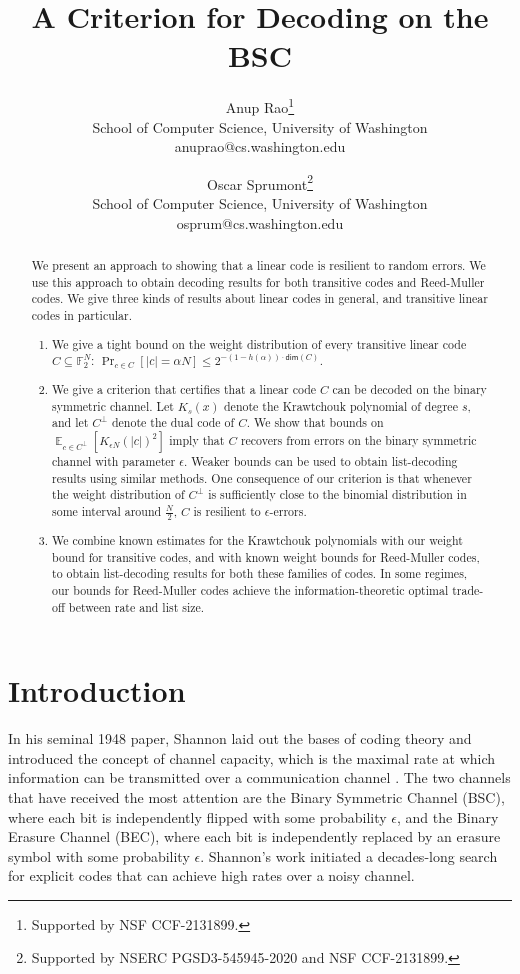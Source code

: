 \documentclass[12pt]{article}
\title{A Criterion for Decoding on the BSC}
\author{
  \fontsize{14pt}{14pt}\selectfont Anup Rao\thanks{Supported by NSF CCF-2131899.}\\
   \fontsize{12pt}{12pt}\selectfont School of Computer Science, University of Washington\\ 
    \fontsize{12pt}{12pt}\selectfont anuprao@cs.washington.edu
  \and
  \fontsize{14pt}{14pt}\selectfont Oscar Sprumont\thanks{Supported by NSERC PGSD3-545945-2020 and NSF CCF-2131899.}\\
  \fontsize{12pt}{12pt} \selectfont School of Computer Science, University of Washington\\
  \fontsize{12pt}{12pt} \selectfont osprum@cs.washington.edu
}
\newcommand{\F}{\mathbb{F}}
\newcommand{\E}{\mathop \mathbb{E}}
\begin{document}
\maketitle

\begin{abstract}
We present an approach to showing that a linear code is resilient to random errors. We use this approach to obtain decoding results for both transitive codes and Reed-Muller codes. We give three kinds of results about linear codes in general, and transitive linear codes in particular.
\begin{enumerate}
\item We give a tight bound on the weight distribution of every transitive linear code $C \subseteq \F_2^N$: $\Pr_{c \in C}[|c| = \alpha N] \leq 2^{-(1-h(\alpha)) \cdot \mathsf{dim}(C)}$. 
\item We give a criterion that certifies that a linear code $C$ can be decoded on the binary symmetric channel. Let $K_s(x)$ denote the Krawtchouk polynomial of degree $s$, and let $C^\perp$ denote the dual code of $C$. We show that bounds on $\E_{c \in C^{\perp}}[ K_{\epsilon N}(|c|)^2]$ imply that $C$ recovers from errors on the binary symmetric channel with parameter $\epsilon$. Weaker bounds can be used to obtain list-decoding results using similar methods. One consequence of our criterion is that whenever the weight distribution of $C^\perp$ is sufficiently close to the binomial distribution in some interval around $\frac{N}{2}$, $C$ is resilient to $\epsilon$-errors.
\item We combine known estimates for the Krawtchouk polynomials with our weight bound for transitive codes, and with known weight bounds for Reed-Muller codes, to obtain list-decoding results for both these families of codes. In some regimes, our bounds for Reed-Muller codes achieve the information-theoretic optimal trade-off between rate and list size.
\end{enumerate}
\end{abstract}




\section{Introduction}\label{intro}
In his seminal 1948 paper, Shannon laid out the bases of coding theory and introduced the concept of channel capacity, which is the maximal rate at which information can be transmitted over a communication channel \cite{shannon1948entropy}. The two channels that have received the most attention are the Binary Symmetric Channel (BSC), where each bit is independently flipped with some probability $\epsilon$, and the Binary Erasure Channel (BEC), where each bit is independently replaced by an erasure symbol with some probability $\epsilon$. Shannon's work initiated a decades-long search for explicit codes that can achieve high rates over a noisy channel. 
\end{document}
